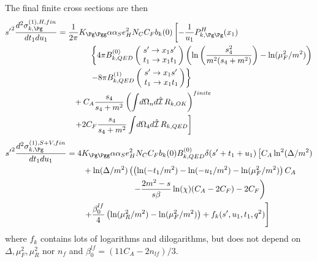 The final finite cross sections are then
\begin{align}
{s'}^2\frac{d^2\sigma_{k,\Pg}^{(1),H,fin}}{dt_1du_1} &=\frac{1}{2\pi}K_{\Pg\Pgg}\alpha\alpha_Se_H^2N_CC_Fb_k(0)\left[-\frac 1 {u_1}P^H_{k,\Pg\Pg}(x_1)\right. \nonumber\\
 &\hspace{40pt}\left\{4\pi B^{(0)}_{k,QED}\left(\!\begin{array}{l}s'\rightarrow x_1s'\\t_1\rightarrow x_1 t_1\end{array}\!\!\right) \left(\ln\left(\frac{s_4^2}{m^2(s_4+m^2)}\right)-\ln(\mu_F^2/m^2)\right)\right. \nonumber\\
 &\hspace{40pt}\left.-8\pi B^{(1)}_{k,QED}\left(\!\begin{array}{l}s'\rightarrow x_1s'\\t_1\rightarrow x_1 t_1\end{array}\!\!\right)\right\} \nonumber\\
 &\hspace{20pt}+C_A\frac{s_4}{s_4+m^2}\left(\int\!d\Omega_nd\hat{\mathcal I}\,R_{k,OK}\right)^{finite} \nonumber\\
 &\hspace{20pt}\left.+2C_F\frac{s_4}{s_4+m^2}\int\!d\Omega_4d\hat{\mathcal I}\,R_{k,QED}\right]
\end{align}
\begin{align}
{s'}^2\frac{d^2\sigma_{k,\Pg}^{(1),S+V,fin}}{dt_1du_1} &=4K_{\Pg\Pgg}\alpha\alpha_Se_H^2N_CC_Fb_k(0)B^{(0)}_{k,QED}\delta(s'+t_1+u_1)\left[C_A\ln^2(\Delta/m^2) \right.\nonumber\\
 &\hspace{20pt} + \ln(\Delta/m^2)\left(\left(\ln(-t_1/m^2)-\ln(-u_1/m^2)-\ln(\mu_F^2/m^2)\right)C_A \right. \nonumber\\
 &\hspace{80pt} \left. - \frac{2m^2-s}{s\beta}\ln(\chi)(C_A-2C_F) - 2C_F\right) \nonumber\\
 &\hspace{20pt}\left. + \frac {\beta_0^{lf}}{4}\left(\ln(\mu_R^2/m^2)- \ln(\mu_F^2/m^2)\right) +  f_k(s',u_1,t_1,q^2)\right]
\end{align}
where $f_k$ contains lots of logarithms and dilogarithms, but does not depend on $\Delta,\mu_F^2,\mu_R^2$ nor $n_f$ and $\beta_0^{lf} = (11C_A - 2n_{lf})/3$.
